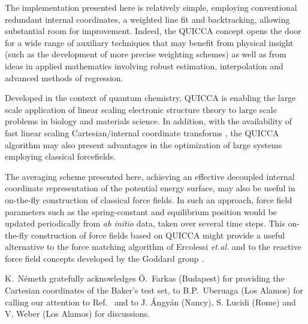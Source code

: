 \documentclass[prl,twocolumn,showpacs,twocolumngrid,superbib]{revtex4}
\begin{document}
The implementation presented here is relatively simple, employing conventional redundant
internal coordinates, a weighted line fit and backtracking, allowing  substantial room for 
improvement.  Indeed, the QUICCA concept opens the door for a wide range of auxiliary techniques 
that may benefit from physical insight (such as the development of more precise weighting schemes) 
as well as from ideas in applied mathematics involving robust estimation, interpolation and 
advanced methods of regression.  

Developed in the context of quantum chemistry, QUICCA is enabling the large scale application of  
linear scaling electronic structure theory to large scale problems in biology and materials science. 
In addition, with the availability of fast linear scaling Cartesian/internal coordinate transforms 
\cite{nemeth_coordtrf1}, the QUICCA algorithm may also present advantages in the optimization of 
large systems employing classical forcefields.

The averaging scheme presented here, achieving an effective decoupled internal coordinate representation
of the potential energy surface, may also be useful in on-the-fly construction of classical force fields.
In such an approach, force field parameters such as the spring-constant and equilibrium position 
would be updated periodically from {\em ab initio} data, taken over several time steps. 
This on-the-fly construction of force fields based on QUICCA might provide a useful  alternative to 
the force matching algorithm of Ercolessi {\it et.al.} \cite{force-matching} and to the reactive 
force field concepts developed by the Goddard group \cite{reaxff1,reaxff2}.

\begin{acknowledgments}
K.~N{\'e}meth gratefully acknowledges {\"{O}}.~Farkas (Budapest) for providing the 
Cartesian coordinates of the Baker's test set, to B.P.~Uberuaga (Los Alamos) for 
calling our attention to Ref.~\cite{force-matching} and to J. {\'A}ngy{\'a}n
(Nancy), S. Lucidi (Rome) and V. Weber (Los Alamos) for discussions.
\end{acknowledgments}


\end{document}
